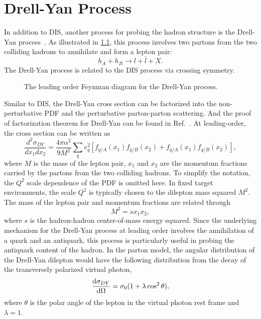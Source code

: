 \documentclass[../main.tex]{subfiles}
\begin{document}
\chapter{Drell-Yan Process}
\label{ch:DY}
In addition to DIS, another process for probing the hadron structure is the Drell-Yan process~\cite{drell1970}.
As illustrated in \cref{fig:DY}, this process involves two partons from the
two colliding hadrons to annihilate and form a lepton pair:
\begin{equation}
	h_A + h_B \rightarrow l + \bar{l} + X.
\end{equation}
The Drell-Yan process is related to the DIS process via crossing symmetry.
\begin{figure}[htbp!]
	\centering
	
	\caption{The leading order Feynman diagram for the Drell-Yan process.}
	\label{fig:DY}
\end{figure}
Similar to DIS, the Drell-Yan cross section can be factorized into the non-perturbative
PDF and the perturbative parton-parton scattering. And the proof of factorization
theorem for Drell-Yan can be found in Ref.~\cite{collins1989}. At leading-order,
the cross section can be written as
\begin{equation}
	\frac{d^2\sigma_{DY}}{dx_{1}dx_{2}} = \frac{4\pi\alpha^2}{9M^2}\sum_q e^2_q
	\left[f_{q/A}\left(x_1\right)f_{\bar{q}/B}\left(x_2\right) +
	f_{\bar{q}/A}\left(x_1\right)f_{q/B}\left(x_2\right)
	\right],
	\label{eq:DY_cs}
\end{equation}
where $M$ is the mass of the lepton pair, $x_1$ and $x_2$ are the momentum fractions
carried by the partons from the two colliding hadrons. To simplify the notation,
the $Q^2$ scale dependence of the PDF is omitted here. In fixed target environments,
the scale $Q^2$ is typically chosen to the dilepton mass squared $M^2$.
The mass of the lepton pair and momentum fractions are related through
\begin{equation}
	M^2= sx_1x_2,
	\label{eq:mass}
\end{equation}
where $s$ is the hadron-hadron center-of-mass energy squared.
Since the underlying mechanism for the Drell-Yan process at leading order involves the annihilation
of a quark and an antiquark, this process is particularly useful in probing the antiquark
content of the hadron.
In the parton model, the angular distribution of the Drell-Yan dilepton would have the following
distribution from the decay of the transversely polarized virtual photon,
\begin{equation}
	\dv{\sigma_{DY}}{\Omega} = \sigma_0(1+\lambda \cos^2\theta),
\end{equation}
where $\theta$ is the polar angle of the lepton in the virtual photon rest frame and $\lambda=1$.
\end{document}
